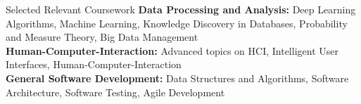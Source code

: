 \documentclass{resume} %
\begin{document}
\begin{rSection}{Selected Relevant Coursework} \itemsep -3pt
{\bf Data Processing and Analysis:} Deep Learning Algorithms, Machine Learning, Knowledge Discovery in Databases, Probability and Measure Theory, Big Data Management\\
{\bf Human-Computer-Interaction:} Advanced topics on HCI, Intelligent User Interfaces, Human-Computer-Interaction\\
{\bf General Software Development:} Data Structures and Algorithms, Software Architecture, Software Testing, Agile Development
\end{rSection}
\end{document}
